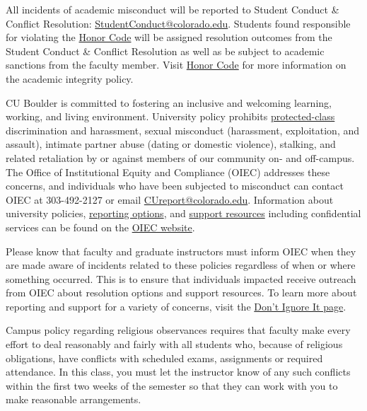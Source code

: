 All incidents of academic misconduct will be reported to Student Conduct \& Conflict Resolution: \href{mailto:StudentConduct@colorado.edu}{StudentConduct@colorado.edu}. 
Students found responsible for violating the \href{https://www.colorado.edu/sccr/honor-code}{Honor Code} will be assigned resolution outcomes from the Student Conduct \& Conflict Resolution as well as be subject to academic sanctions from the faculty member. 
Visit \href{https://www.colorado.edu/sccr/honor-code}{Honor Code} for more information on the academic integrity policy.

\item[Sexual Misconduct, Discrimination, Harassment and/or Related Retaliation:] 

CU Boulder is committed to fostering an inclusive and welcoming learning, working, and living environment. University policy prohibits \href{https://www.colorado.edu/oiec/policies/discrimination-harassment-policy/protected-class-definitions}{protected-class} discrimination and harassment, sexual misconduct (harassment, exploitation, and assault), intimate partner abuse (dating or domestic violence), stalking, and related retaliation by or against members of our community on- and off-campus. The Office of Institutional Equity and Compliance (OIEC) addresses these concerns, and individuals who have been subjected to misconduct can contact OIEC at 303-492-2127 or email \href{mailto:CUreport@colorado.edu}{CUreport@colorado.edu}. Information about university policies, \href{https://www.colorado.edu/oiec/reporting-resolutions/making-report}{reporting options}, and \href{https://www.colorado.edu/oiec/support-resources}{support resources} including confidential services can be found on the \href{http://www.colorado.edu/institutionalequity/}{OIEC website}.

Please know that faculty and graduate instructors must inform OIEC when they are made aware of incidents related to these policies regardless of when or where something occurred. This is to ensure that individuals impacted receive outreach from OIEC about resolution options and support resources. To learn more about reporting and support for a variety of concerns, visit the \href{https://www.colorado.edu/dontignoreit/}{Don’t Ignore It page}.


\item[Religious Accommodations:] 
Campus policy regarding religious observances requires that faculty make every effort to deal reasonably and fairly with all students who, because of religious obligations, have conflicts with scheduled exams, assignments or required attendance. 
In this class, you must let the instructor know of any such conflicts within the first two weeks of the semester so that they can work with you to make reasonable arrangements.

